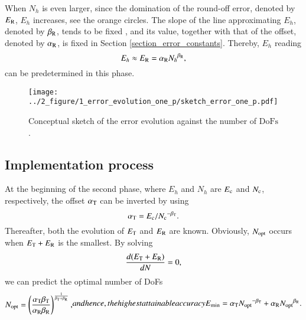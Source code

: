 \documentclass[review,3p]{elsarticle}
\begin{document}
When $N_h$ is even larger, since the domination of the round-off error, denoted by $E_{\rm R}$, $E_h$ increases, see the orange circles. The slope of the line approximating $E_h$, denoted by $\beta_{\rm R}$, tends to be fixed \cite{Babuska2018Roundoff,WalterFrei}, and its value, together with that of the offset, denoted by $\alpha_{\rm R}$, is fixed in Section \ref{section_error_constants}. Thereby, $E_h$ reading
\begin{equation}
 E_{h} \approx E_{\rm R} = \alpha_{\rm R}{N_{h}}^{\beta_{\rm R}},		\label{formula_round_off_error}
\end{equation}
can be predetermined in this phase.


 \begin{figure}[!ht]
 \centering
     \texttt{[image: ../2\_figure/1\_error\_evolution\_one\_p/sketch\_error\_one\_p.pdf]}
     \caption{Conceptual sketch of the error evolution against the number of $\text{DoFs}$.}
     \label{error_evolution_one_p}
 \end{figure}

\subsection{Implementation process}           \label{section_strategy}

At the beginning of the second phase, where $E_h$ and $N_h$ are ${E_{\rm c}}$ and ${N_{\rm c}}$, respectively, the offset $\alpha_{\rm T}$ can be inverted by using
\begin{equation}
 \alpha_{\rm T} = {E_{\rm c}}/{N_{\rm c}}^{- \beta_{\rm T}}.		\label{formula_offset_truncation_error}
\end{equation}
Thereafter, both the evolution of $E_{\rm T}$ and $E_{\rm R}$ are known. Obviously, $N_{\rm opt}$ occurs when $E_{\rm T}+E_{\rm R}$ is the smallest. By solving
\begin{equation}
    \frac{d(E_{\rm T}+E_{\rm R})}{dN}=0,    \label{derivative_condition_N_opt}
\end{equation}
we can predict the optimal number of DoFs
\begin{subequations}
\begin{align}
 N_{\rm opt} = \left( \frac{\alpha_{\rm T} \beta_{\rm T}}{\alpha _{\rm R} \beta_{\rm R}} \right)^{\frac{1}{\beta_{\rm T} + \beta_{\rm R}}},
\end{align}
and hence, the highest attainable accuracy
\begin{align}
 E_{\rm min} = \alpha_{\rm T} {N_{\rm opt}}^{- {\beta _{\rm T}}}+\alpha_{\rm R} {N_{\rm opt}}^{{\beta _{\rm R}}}.
\end{align}
\end{subequations}
\end{document}
